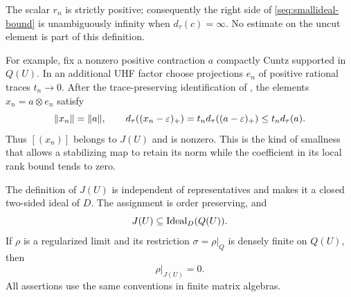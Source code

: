 The scalar \(r_n\) is strictly positive; consequently the right
side of \eqref{seq:smallideal-bound} is unambiguously infinity
when \(d_\tau(c)=\infty\). No estimate on the uncut element is
part of this definition.

For example, fix a nonzero positive contraction \(a\) compactly
Cuntz supported in \(Q(U)\). In an additional UHF factor choose
projections \(e_n\) of positive rational traces \(t_n\to0\).
After the trace-preserving identification of ,
the elements \(x_n=a\otimes e_n\) satisfy
\[
 \|x_n\|=\|a\|,\qquad
 d_\tau((x_n-\varepsilon)_+)
 =t_n d_\tau((a-\varepsilon)_+)\leq t_n d_\tau(a).
\]
Thus \([(x_n)]\) belongs to \(J(U)\) and is nonzero. This is the
kind of smallness that allows a stabilizing map to retain its norm
while the coefficient in its local rank bound tends to zero.

\begin{proposition}
\label{seq:smallideal-properties}
The definition of \(J(U)\) is independent of representatives and
makes it a closed two-sided ideal of \(D\). The assignment is
order preserving, and
\begin{equation}\label{seq:smallideal-support}
 J(U)\subseteq\operatorname{Ideal}_D(Q(U)).
\end{equation}
If \(\rho\) is a regularized limit and its restriction
\(\sigma=\rho|_Q\) is densely finite on \(Q(U)\), then
\begin{equation}\label{seq:smallideal-vanishing}
 \rho|_{J(U)}=0.
\end{equation}
All assertions use the same conventions in finite matrix algebras.
\end{proposition}

